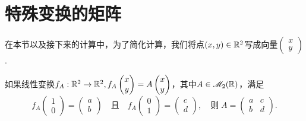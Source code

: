 \section{特殊变换的矩阵}
在本节以及接下来的计算中，为了简化计算，我们将点$(x,y)\in\mathbb R^2$写成向量$\begin{pmatrix}
  x \\ y
\end{pmatrix}$.

\begin{mybox}
  \begin{theorem}[线性变换的矩阵.]

    如果线性变换$f_A:\mathbb R^2\to\mathbb R^2,f_A\begin{pmatrix}
      x \\
      y
    \end{pmatrix}=A\begin{pmatrix}
      x \\
      y
    \end{pmatrix}$，其中$A\in\mathscr M_2(\mathbb R)$，满足
    \[
      f_A\begin{pmatrix}
        1 \\
        0
      \end{pmatrix} = \begin{pmatrix}
        a \\
        b
      \end{pmatrix}\quad \text{且} \quad
      f_A\begin{pmatrix}
        0 \\
        1
      \end{pmatrix} = \begin{pmatrix}
        c \\
        d
      \end{pmatrix},\quad \text{则} \; A = \begin{pmatrix}
        a & c \\
        b & d
      \end{pmatrix}.
    \]
  \end{theorem}
\end{mybox}

